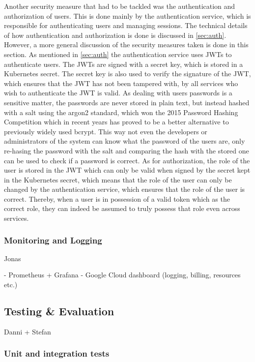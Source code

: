\documentclass[a4paper,12pt]{article}
\begin{document}
Another security measure that had to be tackled was the authentication and authorization of users.
This is done mainly by the authentication service, which is responsible for authenticating users and managing sessions.
The technical details of how authentication and authorization is done is discussed in \autoref{sec:auth}.
However, a more general discussion of the security measures taken is done in this section.
As mentioned in \autoref{sec:auth} the authentication service uses JWTs to authenticate users.
The JWTs are signed with a secret key, which is stored in a Kubernetes secret.
The secret key is also used to verify the signature of the JWT, which ensures that the JWT has not been tampered with, by all services who wish to authenticate the JWT is valid.
As dealing with users passwords is a sensitive matter, the passwords are never stored in plain text, but instead hashed with a salt using the argon2 standard,
which won the 2015 Password Hashing Competition \cite{argon2} which in recent years has proved to be a better alternative to previously widely used bcrypt.
This way not even the developers or administrators of the system can know what the password of the users are,
only re-hasing the password with the salt and comparing the hash with the stored one can be used to check if a password is correct.
As for authorization, the role of the user is stored in the JWT which can only be valid when signed by the secret kept in the Kubernetes secret,
which means that the role of the user can only be changed by the authentication service, which ensures that the role of the user is correct.
Thereby, when a user is in possession of a valid token which as the correct role, they can indeed be assumed to truly possess that role even across services.

    
\subsubsection{Monitoring and Logging}

Jonas

- Prometheus + Grafana
- Google Cloud dashboard (logging, billing, resources etc.)

\subsection{Testing \& Evaluation}

Danni + Stefan

\subsubsection{Unit and integration tests}
\end{document}
